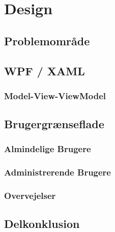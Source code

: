 \chapter{Design}

\section{Problemområde}

\section{WPF / XAML}
\subsection{Model-View-ViewModel}

\section{Brugergrænseflade}
\subsection{Almindelige Brugere}
\subsection{Administrerende Brugere}
\subsection{Overvejelser}

\section{Delkonklusion}



